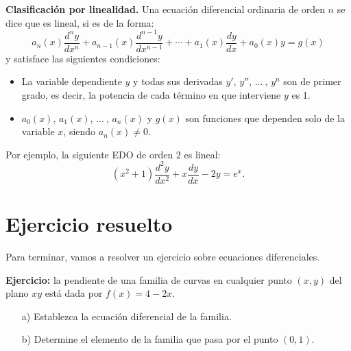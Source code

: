 \documentclass[12pt,a4paper,oneside]{book}
\begin{document}
	\noindent
	\textbf{Clasificación por linealidad.} Una ecuación diferencial ordinaria de orden $n$ se dice que es lineal, si es de la forma:
	\[
	 a_n(x)\frac{d^ny}{d x^n} + a_{n-1}(x)\frac{d^{n-1}y}{d x^{n-1}} + \cdots + a_1(x)\frac{dy}{d x} + a_0(x)y = g(x)
	\]
	y satisface las siguientes condiciones:
	\begin{itemize}
		\item La variable dependiente $y$ y todas sus derivadas $y'$, $y''$, $\ldots \ $, $y^n$ son de primer grado, es decir, la potencia de cada término en que interviene $y$ es 1.
		\item $a_0(x)$, $a_1(x)$, $\ldots \ $, $a_n(x)$ y $g(x)$ son funciones que dependen solo de la variable $x$, siendo $a_n(x)\neq0$.
	\end{itemize}
    
    \medskip
    \noindent
    Por ejemplo, la siguiente EDO de orden 2 es lineal: 
    	\[
    (x^2+1)\frac{d^2y}{d x^2} + x\frac{dy}{d x} - 2y = e^x.
    \]
    
    \section{Ejercicio resuelto}
    \noindent
    Para terminar, vamos a resolver un ejercicio sobre ecuaciones diferenciales.
    
    \medskip
    \noindent
    \textbf{Ejercicio:} la pendiente de una familia de curvas en cualquier punto $(x,y)$ del plano $xy$ está dada por $f(x)=4-2x$.
    \begin{itemize}
    	\item[a)] Establezca la ecuación diferencial de la familia.
    	\item[b)] Determine el elemento de la familia que pasa por el punto $(0,1)$.	
    \end{itemize}
    
\end{document}
